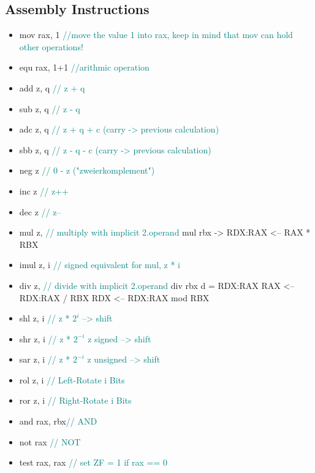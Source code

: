 \documentclass[main.tex,fontsize=8pt,paper=a4,paper=landscape,DIV=calc,]{scrartcl}
\begin{document}
\begin{multicols*}{4}
\subsection{Assembly Instructions}
\begin{itemize}
\item mov rax, 1 \textcolor{teal}{//move the value 1 into rax, keep in mind that mov can hold other operations!}
\item equ rax, 1+1 \textcolor{teal}{//arithmic operation}
\item add z,   q  \textcolor{teal}{// z + q} 
\item sub z,   q  \textcolor{teal}{// z - q}
\item adc z,   q  \textcolor{teal}{// z + q + c (carry -> previous calculation)}
\item sbb z,   q  \textcolor{teal}{// z - q - c (carry -> previous calculation)}
\item neg z       \textcolor{teal}{// 0 - z ("zweierkomplement")}
\item inc z       \textcolor{teal}{// z++ }
\item dec z       \textcolor{teal}{// z-- }
\item mul z,      \textcolor{teal}{// multiply with implicit 2.operand }\newline
mul rbx -> RDX:RAX <-- RAX * RBX
\item imul z,   i  \textcolor{teal}{// signed equivalent for mul, z * i }
\item div z,      \textcolor{teal}{// divide with implicit 2.operand}\newline
div rbx  \newline
d = RDX:RAX\newline
RAX <-- RDX:RAX / RBX\newline
RDX <-- RDX:RAX mod RBX
\item shl z,   i  \textcolor{teal}{// z * \(2^i\)               --> shift}
\item shr z,   i  \textcolor{teal}{// z * \(2^{-i}\) z signed   --> shift}
\item sar z,   i  \textcolor{teal}{// z * \(2^{-i}\) z unsigned --> shift}
\item rol z,   i  \textcolor{teal}{// Left-Rotate i Bits }
\item ror z,   i  \textcolor{teal}{// Right-Rotate i Bits }
\item and rax, rbx\textcolor{teal}{// AND}
\item not rax     \textcolor{teal}{// NOT}
\item test rax, rax \textcolor{teal}{// set ZF = 1 if rax == 0}

\end{itemize}
\end{multicols*}
\end{document}
